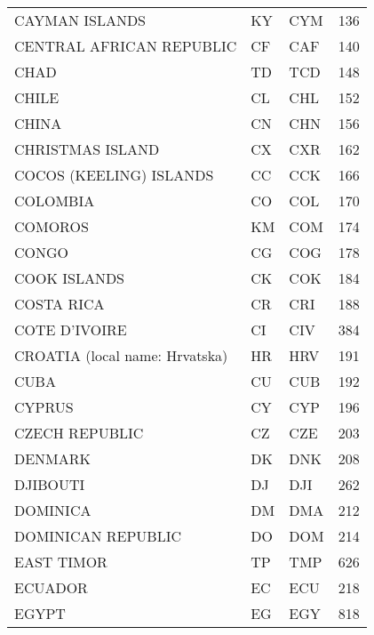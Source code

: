\begin{footnotesize}
\begin{longtable}[c]{ p{} p{} p{} p{}}
    CAYMAN ISLANDS                                 & KY & CYM & 136 \\
    CENTRAL AFRICAN REPUBLIC                       & CF & CAF & 140 \\
    CHAD                                           & TD & TCD & 148 \\
    CHILE                                          & CL & CHL & 152 \\
    CHINA                                          & CN & CHN & 156 \\
    CHRISTMAS ISLAND                               & CX & CXR & 162 \\
    COCOS (KEELING) ISLANDS                        & CC & CCK & 166 \\
    COLOMBIA                                       & CO & COL & 170 \\
    COMOROS                                        & KM & COM & 174 \\
    CONGO                                          & CG & COG & 178 \\
    COOK ISLANDS                                   & CK & COK & 184 \\
    COSTA RICA                                     & CR & CRI & 188 \\
    COTE D'IVOIRE                                  & CI & CIV & 384 \\
    CROATIA (local name: Hrvatska)                 & HR & HRV & 191 \\
    CUBA                                           & CU & CUB & 192 \\
    CYPRUS                                         & CY & CYP & 196 \\
    CZECH REPUBLIC                                 & CZ & CZE & 203 \\
    DENMARK                                        & DK & DNK & 208 \\
    DJIBOUTI                                       & DJ & DJI & 262 \\
    DOMINICA                                       & DM & DMA & 212 \\
    DOMINICAN REPUBLIC                             & DO & DOM & 214 \\
    EAST TIMOR                                     & TP & TMP & 626 \\
    ECUADOR                                        & EC & ECU & 218 \\
    EGYPT                                          & EG & EGY & 818 \\

\end{longtable}
\end{footnotesize}
